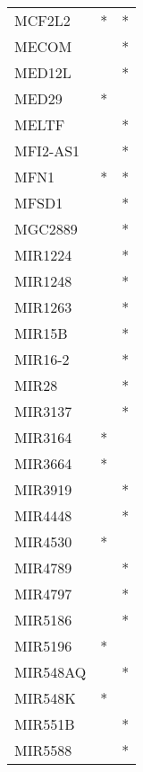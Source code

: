 \begin{longtable}{lcc}
MCF2L2           &              * &          * \\
MECOM            &                &          * \\
MED12L           &                &          * \\
MED29            &              * &            \\
MELTF            &                &          * \\
MFI2-AS1         &                &          * \\
MFN1             &              * &          * \\
MFSD1            &                &          * \\
MGC2889          &                &          * \\
MIR1224          &                &          * \\
MIR1248          &                &          * \\
MIR1263          &                &          * \\
MIR15B           &                &          * \\
MIR16-2          &                &          * \\
MIR28            &                &          * \\
MIR3137          &                &          * \\
MIR3164          &              * &            \\
MIR3664          &              * &            \\
MIR3919          &                &          * \\
MIR4448          &                &          * \\
MIR4530          &              * &            \\
MIR4789          &                &          * \\
MIR4797          &                &          * \\
MIR5186          &                &          * \\
MIR5196          &              * &            \\
MIR548AQ         &                &          * \\
MIR548K          &              * &            \\
MIR551B          &                &          * \\
MIR5588          &                &          * \\

\end{longtable}
